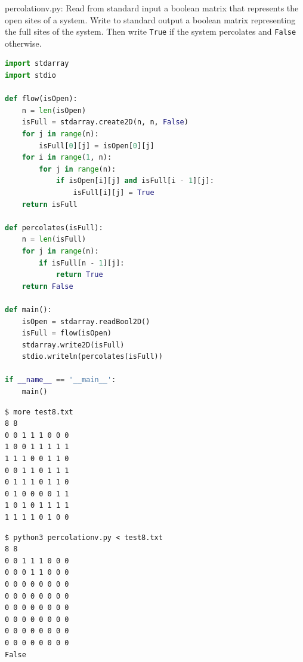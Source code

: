 \documentclass[8pt,a4paper,compress]{beamer}
\begin{document}
\begin{frame}[fragile]
\pause

\begin{framed}
\tiny percolationv.py: Read from standard input a boolean matrix that represents the open sites of a system. Write to standard output a boolean matrix representing the full sites of the system. Then write \lstinline{True} if the system percolates and \lstinline{False} otherwise.
\end{framed}

\begin{lstlisting}[language=Python,style=focusin]
import stdarray
import stdio

def flow(isOpen):
    n = len(isOpen)
    isFull = stdarray.create2D(n, n, False)
    for j in range(n):
        isFull[0][j] = isOpen[0][j]
    for i in range(1, n):
        for j in range(n):
            if isOpen[i][j] and isFull[i - 1][j]:
                isFull[i][j] = True
    return isFull

def percolates(isFull):
    n = len(isFull)
    for j in range(n):
        if isFull[n - 1][j]:
            return True
    return False

def main():
    isOpen = stdarray.readBool2D()
    isFull = flow(isOpen)
    stdarray.write2D(isFull)
    stdio.writeln(percolates(isFull))
    
if __name__ == '__main__':
    main()
\end{lstlisting}
\end{frame}

\begin{frame}[fragile]
\pause

\begin{lstlisting}[language={},style=focusin]
$ more test8.txt 
8 8
0 0 1 1 1 0 0 0
1 0 0 1 1 1 1 1
1 1 1 0 0 1 1 0
0 0 1 1 0 1 1 1
0 1 1 1 0 1 1 0
0 1 0 0 0 0 1 1
1 0 1 0 1 1 1 1
1 1 1 1 0 1 0 0
\end{lstlisting}

\pause

\begin{lstlisting}[language={},style=focusin]
$ python3 percolationv.py < test8.txt 
8 8
0 0 1 1 1 0 0 0 
0 0 0 1 1 0 0 0 
0 0 0 0 0 0 0 0 
0 0 0 0 0 0 0 0 
0 0 0 0 0 0 0 0 
0 0 0 0 0 0 0 0 
0 0 0 0 0 0 0 0 
0 0 0 0 0 0 0 0 
False
\end{lstlisting}
\end{frame}
\end{document}
